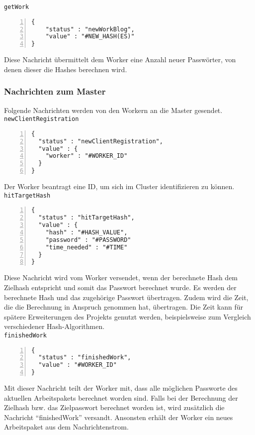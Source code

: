 \texttt{getWork}
\begin{lstlisting}[basicstyle=\ttfamily,numbers=left,numberstyle=\footnotesize\ttfamily,backgroundcolor=\color{sourcegray}]
{
	"status" : "newWorkBlog",
  	"value" : "#NEW_HASH(ES)"
}
\end{lstlisting}
Diese Nachricht übermittelt dem Worker eine Anzahl neuer Passwörter, von denen dieser die Hashes berechnen wird.


\subsubsection{Nachrichten zum Master}
Folgende Nachrichten werden von den Workern an die Master gesendet. \\

\texttt{newClientRegistration}
\begin{lstlisting}[basicstyle=\ttfamily,numbers=left,numberstyle=\footnotesize\ttfamily,backgroundcolor=\color{sourcegray}]
{
  "status" : "newClientRegistration",
  "value" : {
    "worker" : "#WORKER_ID"
  }
}
\end{lstlisting}
Der Worker beantragt eine ID, um sich im Cluster identifizieren zu können.\\

\texttt{hitTargetHash}
\begin{lstlisting}[basicstyle=\ttfamily,numbers=left,numberstyle=\footnotesize\ttfamily,backgroundcolor=\color{sourcegray}]
{
  "status" : "hitTargetHash",
  "value" : {
    "hash" : "#HASH_VALUE",
    "password" : "#PASSWORD"
    "time_needed" : "#TIME"
  }
}\end{lstlisting}
Diese Nachricht wird vom Worker versendet, wenn der berechnete Hash dem Zielhash entspricht und somit das Passwort berechnet wurde. Es werden der berechnete Hash und das zugehörige Passwort übertragen. Zudem wird die Zeit, die die Berechnung in Anspruch genommen hat, übertragen. Die Zeit kann für spätere Erweiterungen des Projekts genutzt werden, beispielsweise zum Vergleich verschiedener Hash-Algorithmen.\\

\texttt{finishedWork}
\begin{lstlisting}[basicstyle=\ttfamily,numbers=left,numberstyle=\footnotesize\ttfamily,backgroundcolor=\color{sourcegray}]
{
  "status" : "finishedWork",
  "value" : "#WORKER_ID"
}
\end{lstlisting}
Mit dieser Nachricht teilt der Worker mit, dass alle möglichen Passworte des aktuellen Arbeitspakets berechnet worden sind. Falls bei der Berechnung der Zielhash bzw. das Zielpasswort berechnet worden ist, wird zusätzlich die Nachricht \enquote{finishedWork} versandt. Ansonsten erhält der Worker ein neues Arbeitspaket aus dem Nachrichtenstrom. \\


